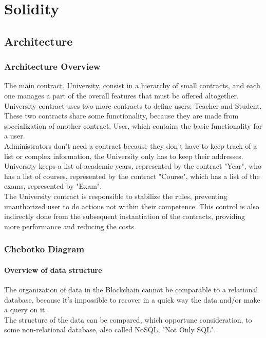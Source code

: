 \documentclass[ManualeSviluppatore]{subfiles}
\begin{document}

\chapter{Solidity}
\section{Architecture}
\subsection{Architecture Overview}
The main contract, University, consist in a hierarchy of small contracts, and each one manages a part of the overall features that must be offered altogether.\\
University contract uses two more contracts to define users: Teacher and Student. These two contracts share some functionality, because they are made from specialization of another contract, User, which contains the basic functionality for a user.\\
Administrators don't need a contract because they don't have to keep track of a list or complex information, the University only has to keep their addresses.\\
University keeps a list of academic years, represented by the contract "Year", who has a list of courses, represented by the contract "Course", which has a list of the exams, represented by "Exam".\\

The University contract is responsible to stabilize the rules, preventing unauthorized user to do actions not within their competence. This control is also indirectly done from the subsequent instantiation of the contracts, providing more performance and reducing the costs.\\

\subsection{Chebotko Diagram}
\subsubsection{Overview of data structure}
The organization of data in the Blockchain cannot be comparable to a relational database, because it's impossible to recover in a quick way the data and/or make a query on it.\\
The structure of the data can be compared, which opportune consideration, to some non-relational database, also called NoSQL, "Not Only SQL".\\
\end{document}

